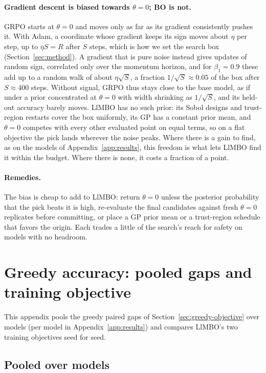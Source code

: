 \documentclass[twoside]{article}
\newcommand{\llmbo}{LlMBO}
\begin{document}
\paragraph{Gradient descent is biased towards $\theta = 0$; BO is not.}
GRPO starts at $\theta = 0$ and moves only as far as its gradient consistently pushes it. With Adam, a coordinate whose gradient keeps its sign moves about $\eta$ per step, up to $\eta S = R$ after $S$ steps, which is how we set the search box (Section~\ref{sec:method}). A gradient that is pure noise instead gives updates of random sign, correlated only over the momentum horizon, and for $\beta_1 = 0.9$ these add up to a random walk of about $\eta\sqrt{S}$, a fraction $1/\sqrt{S} \approx 0.05$ of the box after $S \approx 400$ steps. Without signal, GRPO thus stays close to the base model, as if under a prior concentrated at $\theta = 0$ with width shrinking as $1/\sqrt{S}$, and its held-out accuracy barely moves. \llmbo{} has no such prior: its Sobol designs and trust-region restarts cover the box uniformly, its GP has a constant prior mean, and $\theta = 0$ competes with every other evaluated point on equal terms, so on a flat objective the pick lands wherever the noise peaks. Where there is a gain to find, as on the models of Appendix~\ref{app:results}, this freedom is what lets \llmbo{} find it within the budget. Where there is none, it costs a fraction of a point.

\paragraph{Remedies.}
The bias is cheap to add to \llmbo{}: return $\theta = 0$ unless the posterior probability that the pick beats it is high, re-evaluate the final candidates against fresh $\theta = 0$ replicates before committing, or place a GP prior mean or a trust-region schedule that favors the origin. Each trades a little of the search's reach for safety on models with no headroom.

\FloatBarrier
\clearpage
\section{Greedy accuracy: pooled gaps and training objective}
\label{app:greedy}
This appendix pools the greedy paired gaps of Section~\ref{sec:greedy-objective} over models (per model in Appendix~\ref{app:results}) and compares \llmbo{}'s two training objectives seed for seed.

\subsection{Pooled over models}
\label{app:greedy-pooled}
\end{document}
